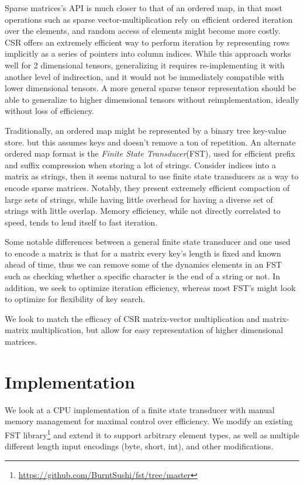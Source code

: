 \documentclass[12pt]{article}
\begin{document}
Sparse matrices's API is much closer to that of an ordered map, in that most operations
such as sparse vector-multiplication rely on efficient ordered iteration over the elements, and
random access of elements might become more costly. CSR offers an extremely efficient way to
perform iteration by representing rows implicitly as a series of pointers into column indices.
While this approach works well for 2 dimensional tensors, generalizing it requires
re-implementing it with another level of indirection, and it would not be immediately compatible
with lower dimensional tensors. A more general sparse tensor representation should be able to
generalize to higher dimensional tensors without reimplementation, ideally without loss of
efficiency.

Traditionally, an ordered map might be represented by a binary tree key-value store. but this
assumes keys and doesn't remove a ton of repetition. An alternate ordered map format is the
\textit{Finite State Transducer}(FST), used for efficient prefix and suffix compression when
storing a lot of strings. Consider indices into a matrix as strings, then it seems natural to
use finite state transducers as a way to encode sparse matrices. Notably, they present extremely
efficient compaction of large sets of strings, while having little overhead for having a diverse
set of strings with little overlap. Memory efficiency, while not directly correlated to speed,
tends to lend itself to fast iteration.

Some notable differences between a general finite state transducer and one used to encode a
matrix is that for a matrix every key's length is fixed and known ahead of time, thus we can
remove some of the dynamics elements in an FST such as checking whether a specific character is
the end of a string or not. In addition, we seek to optimize iteration efficiency, whereas most
FST's might look to optimize for flexibility of key search.

We look to match the efficacy of CSR matrix-vector multiplication and matrix-matrix
multiplication, but allow for easy representation of higher dimensional matrices.

\section*{Implementation}

We look at a CPU implementation of a finite state transducer with manual memory management for
maximal control over efficiency. We modify an existing FST
library\footnote{\url{https://github.com/BurntSushi/fst/tree/master}} and extend it to support
arbitrary element types, as well as multiple different length input encodings (byte, short,
int), and other modifications.
\end{document}
